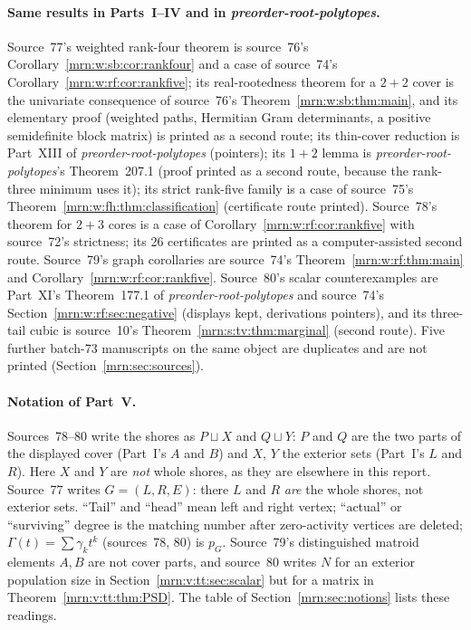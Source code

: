 \documentclass[11pt,a4paper]{article}
\theoremstyle{remark}\newtheorem{remark}[theorem]{Remark}
\newcommand{\prp}{\emph{preorder-root-polytopes}}
\begin{document}
\paragraph{Same results in Parts~I--IV and in \prp.}
Source~77's weighted rank-four theorem is source~76's
Corollary~\ref{mrn:w:sb:cor:rankfour} and a case of source~74's
Corollary~\ref{mrn:w:rf:cor:rankfive}; its real-rootedness theorem for a
$2+2$ cover is the univariate consequence of source~76's
Theorem~\ref{mrn:w:sb:thm:main}, and its elementary proof (weighted paths,
Hermitian Gram determinants, a positive semidefinite block matrix) is
printed as a second route; its thin-cover reduction is Part~XIII of \prp{}
(pointers); its $1+2$ lemma is \prp's Theorem~207.1 (proof printed as a
second route, because the rank-three minimum uses it); its strict rank-five
family is a case of source~75's Theorem~\ref{mrn:w:fh:thm:classification}
(certificate route printed). Source~78's theorem for $2+3$ cores is a case of
Corollary~\ref{mrn:w:rf:cor:rankfive} with source~72's strictness; its 26
certificates are printed as a computer-assisted second route. Source~79's
graph corollaries are source~74's Theorem~\ref{mrn:w:rf:thm:main} and
Corollary~\ref{mrn:w:rf:cor:rankfive}. Source~80's scalar counterexamples are
Part~XI's Theorem~177.1 of \prp{} and source~74's
Section~\ref{mrn:w:rf:sec:negative} (displays kept, derivations pointers), and
its three-tail cubic is source~10's Theorem~\ref{mrn:s:tv:thm:marginal}
(second route). Five further batch-73 manuscripts on the same object are
duplicates and are not printed (Section~\ref{mrn:sec:sources}).

\paragraph{Notation of Part~V.}
Sources~78--80 write the shores as $P\sqcup X$ and $Q\sqcup Y$: $P$ and $Q$
are the two parts of the displayed cover (Part~I's $A$ and $B$) and $X$, $Y$
the exterior sets (Part~I's $L$ and $R$). Here $X$ and $Y$ are \emph{not}
whole shores, as they are elsewhere in this report. Source~77 writes
$G=(L,R,E)$: there $L$ and $R$ \emph{are} the whole shores, not exterior
sets. ``Tail'' and ``head'' mean left and right vertex; ``actual'' or
``surviving'' degree is the matching number after zero-activity vertices are
deleted; $\Gamma(t)=\sum\gamma_kt^k$ (sources~78, 80) is $p_G$. Source~79's
distinguished matroid elements $A,B$ are not cover parts, and source~80
writes $N$ for an exterior population size in
Section~\ref{mrn:v:tt:sec:scalar} but for a matrix in
Theorem~\ref{mrn:v:tt:thm:PSD}. The table of Section~\ref{mrn:sec:notions}
lists these readings.
\end{document}
